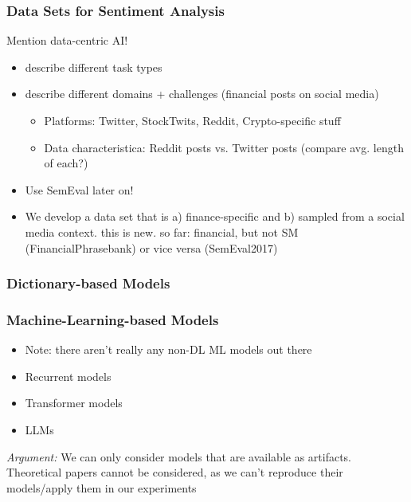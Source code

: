 \subsubsection{Data Sets for Sentiment Analysis}
Mention data-centric AI!
\begin{itemize}[noitemsep]
	\item describe different task types
	\item describe different domains + challenges (financial posts on social media)
	\begin{itemize}[noitemsep]
		\item Platforms: Twitter, StockTwits, Reddit, Crypto-specific stuff
		\item Data characteristica: Reddit posts vs. Twitter posts (compare avg. length of each?)
\end{itemize}
	\item Use SemEval later on!
	\item We develop a data set that is a) finance-specific and b) sampled from a social media context. this is new. so far: financial, but not SM (FinancialPhrasebank) or vice versa (SemEval2017)
\end{itemize}

\subsubsection{Dictionary-based Models}


\subsubsection{Machine-Learning-based Models}
\begin{itemize}[noitemsep]
	\item Note: there aren't really any non-DL ML models out there
	\item Recurrent models
	\item Transformer models
	\item LLMs
\end{itemize}


\emph{Argument:} We can only consider models that are available as artifacts. Theoretical papers cannot be considered, as we can't reproduce their models/apply them in our experiments










